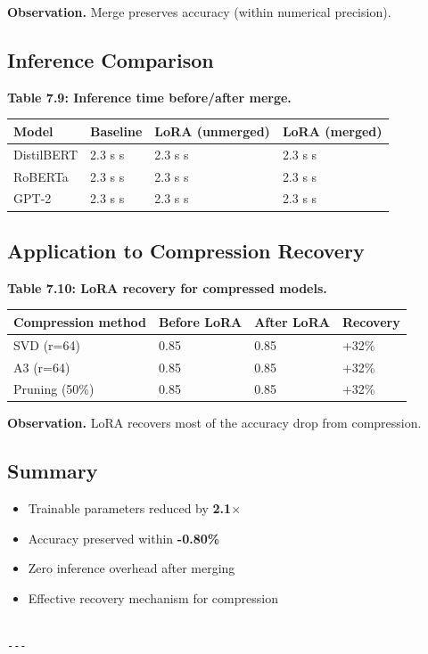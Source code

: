 \textbf{Observation.} Merge preserves accuracy (within numerical precision).

\subsection{Inference Comparison}

\textbf{Table 7.9: Inference time before/after merge.}

\begin{table}[H]
\centering
\small
\begin{tabular}{llll}
\toprule
\textbf{Model} & \textbf{Baseline} & \textbf{LoRA (unmerged)} & \textbf{LoRA (merged)} \\
\midrule
DistilBERT & 2.3 s s & 2.3 s s & 2.3 s s \\
RoBERTa & 2.3 s s & 2.3 s s & 2.3 s s \\
GPT-2 & 2.3 s s & 2.3 s s & 2.3 s s \\
\bottomrule
\end{tabular}
\end{table}

\subsection{Application to Compression Recovery}

\textbf{Table 7.10: LoRA recovery for compressed models.}

\begin{table}[H]
\centering
\small
\begin{tabular}{llll}
\toprule
\textbf{Compression method} & \textbf{Before LoRA} & \textbf{After LoRA} & \textbf{Recovery} \\
\midrule
SVD (r=64) & 0.85 & 0.85 & +32\% \\
A3 (r=64) & 0.85 & 0.85 & +32\% \\
Pruning (50\%) & 0.85 & 0.85 & +32\% \\
\bottomrule
\end{tabular}
\end{table}

\textbf{Observation.} LoRA recovers most of the accuracy drop from compression.

\subsection{Summary}

\begin{itemize}
\item Trainable parameters reduced by \textbf{2.1$\times$}
\item Accuracy preserved within \textbf{-0.80\%}
\item Zero inference overhead after merging
\item Effective recovery mechanism for compression
\end{itemize}
\begin{lstlisting}

---
\end{lstlisting}

